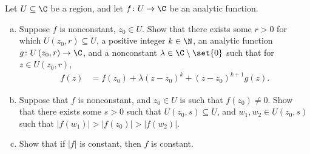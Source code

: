 \documentclass[10pt]{mypackage}
\begin{document}
\begin{problem}[Problem 3]
  Let $U\subseteq \C$ be a region, and let $f\colon U\rightarrow \C$ be an analytic function.
  \begin{enumerate}[(a)]
    \item Suppose $f$ is nonconstant, $z_0\in U$. Show that there exists some $r > 0$ for which $U\left( z_0,r \right)\subseteq U$, a positive integer $k\in \N$, an analytic function $g\colon U\left( z_0,r \right)\rightarrow \C$, and a nonconstant $\lambda\in \C\setminus \set{0}$ such that for $z\in U\left( z_0,r \right)$,
      \begin{align*}
        f(z) &= f\left(z_0\right) + \lambda\left( z-z_0 \right)^{k} + \left( z-z_0 \right)^{k+1} g(z).
      \end{align*}
    \item Suppose that $f$ is nonconstant, and $z_0\in U$ is such that $f\left( z_0 \right) \neq 0$. Show that there exists some $s > 0$ such that $U\left( z_0,s \right)\subseteq U$, and $w_1,w_2\in U\left( z_0,s \right)$ such that $\left\vert f\left( w_1 \right) \right\vert > \left\vert f\left( z_0 \right) \right\vert > \left\vert f\left( w_2 \right) \right\vert$.
    \item Show that if $\left\vert f \right\vert$ is constant, then $f$ is constant.
  \end{enumerate}
\end{problem}
\end{document}
